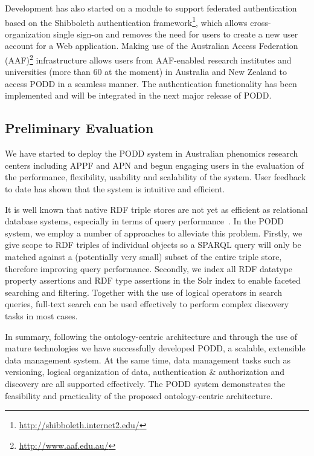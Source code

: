 \documentclass[preprint,12pt]{elsarticle}
\begin{document}
Development has also started on a module to support federated authentication based on the Shibboleth authentication framework\footnote{\url{http://shibboleth.internet2.edu/}}, which allows cross-organization single sign-on and removes the need for users to create a new user account for a Web application. Making use of the Australian Access Federation (AAF)\footnote{\url{http://www.aaf.edu.au/}} infrastructure allows users from AAF-enabled research institutes and universities (more than 60 at the moment) in Australia and New Zealand to access PODD in a seamless manner. The authentication functionality has been implemented and will be integrated in the next major release of PODD.

\subsection{Preliminary Evaluation}
We have started to deploy the PODD system in Australian phenomics research centers including APPF and APN and begun engaging users in the evaluation of the performance, flexibility, usability and scalability of the system. User feedback to date has shown that the system is intuitive and efficient.

It is well known that native RDF triple stores are not yet as efficient as relational database systems, especially in terms of query performance~\cite{10.1109/ICDE.2009.28,Bizer09theberlin}. In the PODD system, we employ a number of approaches to alleviate this problem. Firstly, we give scope to RDF triples of individual objects so a SPARQL query will only be matched against a (potentially very small) subset of the entire triple store, therefore improving query performance. Secondly, we index all RDF datatype property assertions and RDF type assertions in the Solr index to enable faceted searching and filtering. Together with the use of logical operators in search queries, full-text search can be used effectively to perform complex discovery tasks in most cases.

In summary, following the ontology-centric architecture and through the use of mature technologies we have successfully developed PODD, a scalable, extensible data management system. At the same time, data management tasks such as versioning, logical organization of data, authentication \& authorization and discovery are all supported effectively. The PODD system demonstrates the feasibility and practicality of the proposed ontology-centric architecture.
\end{document}

